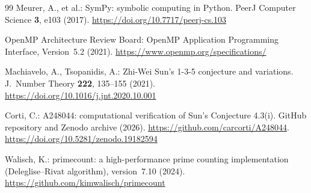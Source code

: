 \documentclass[11pt]{article}
\theoremstyle{definition}
\theoremstyle{remark}
\numberwithin{equation}{section}
\begin{document}
\begin{thebibliography}{99}
Meurer, A., et al.:
SymPy: symbolic computing in Python.
PeerJ Computer Science \textbf{3}, e103 (2017).
\url{https://doi.org/10.7717/peerj-cs.103}

OpenMP Architecture Review Board:
OpenMP Application Programming Interface, Version~5.2 (2021).
\url{https://www.openmp.org/specifications/}

Machiavelo, A., Tsopanidis, A.:
Zhi-Wei Sun's 1-3-5 conjecture and variations.
J.\ Number Theory \textbf{222}, 135--155 (2021).
\url{https://doi.org/10.1016/j.jnt.2020.10.001}

Corti, C.:
A248044: computational verification of Sun's Conjecture 4.3(i).
GitHub repository and Zenodo archive (2026).
\url{https://github.com/carcorti/A248044}.
\url{https://doi.org/10.5281/zenodo.19182594}

Walisch, K.:
primecount: a high-performance prime counting implementation
(Deleglise--Rivat algorithm), version~7.10 (2024).
\url{https://github.com/kimwalisch/primecount}

\end{thebibliography}
\end{document}
